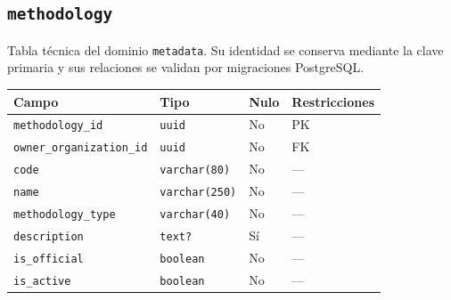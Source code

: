 \documentclass[11pt]{article}
\begin{document}
\subsection{\texttt{methodology}}
Tabla técnica del dominio \texttt{metadata}. Su identidad se conserva mediante la clave primaria y sus relaciones se validan por migraciones PostgreSQL.
\begin{longtable}{>{\raggedright\arraybackslash}p{} p{} p{} p{}}
\toprule Campo & Tipo & Nulo & Restricciones \\ \midrule\endhead
\texttt{methodology\_id} & \texttt{uuid} & No & PK \\
\texttt{owner\_organization\_id} & \texttt{uuid} & No & FK \\
\texttt{code} & \texttt{varchar(80)} & No & --- \\
\texttt{name} & \texttt{varchar(250)} & No & --- \\
\texttt{methodology\_type} & \texttt{varchar(40)} & No & --- \\
\texttt{description} & \texttt{text?} & Sí & --- \\
\texttt{is\_official} & \texttt{boolean} & No & --- \\
\texttt{is\_active} & \texttt{boolean} & No & --- \\
\bottomrule\end{longtable}
\end{document}
